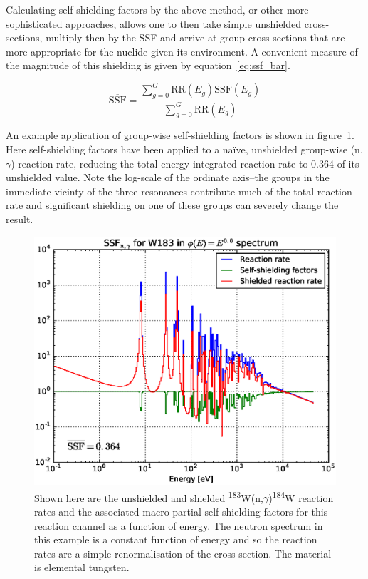 Calculating self-shielding factors by the above method, or other more sophisticated approaches, allows one to then take simple unshielded cross-sections, multiply then by the SSF and arrive at group cross-sections that are more appropriate for the nuclide given its environment. A convenient measure of the magnitude of this shielding is given by equation~\ref{eq:ssf_bar}.

\begin{equation}
  \label{eq:ssf_bar}
  \overline{\mathrm{SSF}} = \frac{\sum_{g=0}^{G}\mathrm{RR}(E_{g})\mathrm{SSF}(E_{g})}
                                          {\sum_{g=0}^{G}\mathrm{RR}(E_{g})}
\end{equation}

An example application of group-wise self-shielding factors is shown in figure~\ref{fig:W183_gamma}. Here self-shielding factors have been applied to a na\"ive, unshielded group-wise (n,$\gamma$) reaction-rate, reducing the total energy-integrated reaction rate to 0.364 of its unshielded value. Note the log-scale of the ordinate axis--the groups in the immediate vicinty of the three resonances contribute much of the total reaction rate and significant shielding on one of these groups can severely change the result.

\begin{figure}[H]
  \centering
  \includegraphics[width=\linewidth]{W183_gamma}
  \caption{Shown here are the unshielded and shielded \textsuperscript{183}W(n,$\gamma$)\textsuperscript{184}W reaction rates and the associated macro-partial self-shielding factors for this reaction channel as a function of energy. The neutron spectrum in this example is a constant function of energy and so the reaction rates are a simple renormalisation of the cross-section. The material is elemental tungsten.}
  \label{fig:W183_gamma}
\end{figure}

